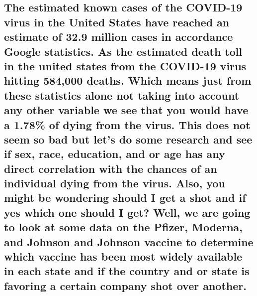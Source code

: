 \documentclass[
]{article}
\begin{document}
\hypertarget{the-estimated-known-cases-of-the-covid-19-virus-in-the-united-states-have-reached-an-estimate-of-32.9-million-cases-in-accordance-google-statistics.-as-the-estimated-death-toll-in-the-united-states-from-the-covid-19-virus-hitting-584000-deaths.-which-means-just-from-these-statistics-alone-not-taking-into-account-any-other-variable-we-see-that-you-would-have-a-1.78-of-dying-from-the-virus.-this-does-not-seem-so-bad-but-lets-do-some-research-and-see-if-sex-race-education-and-or-age-has-any-direct-correlation-with-the-chances-of-an-individual-dying-from-the-virus.-also-you-might-be-wondering-should-i-get-a-shot-and-if-yes-which-one-should-i-get-well-we-are-going-to-look-at-some-data-on-the-pfizer-moderna-and-johnson-and-johnson-vaccine-to-determine-which-vaccine-has-been-most-widely-available-in-each-state-and-if-the-country-and-or-state-is-favoring-a-certain-company-shot-over-another.}{%
\subsection{The estimated known cases of the COVID-19 virus in the
United States have reached an estimate of 32.9 million cases in
accordance Google statistics. As the estimated death toll in the united
states from the COVID-19 virus hitting 584,000 deaths. Which means just
from these statistics alone not taking into account any other variable
we see that you would have a 1.78\% of dying from the virus. This does
not seem so bad but let's do some research and see if sex, race,
education, and or age has any direct correlation with the chances of an
individual dying from the virus. Also, you might be wondering should I
get a shot and if yes which one should I get? Well, we are going to look
at some data on the Pfizer, Moderna, and Johnson and Johnson vaccine to
determine which vaccine has been most widely available in each state and
if the country and or state is favoring a certain company shot over
another.}\label{the-estimated-known-cases-of-the-covid-19-virus-in-the-united-states-have-reached-an-estimate-of-32.9-million-cases-in-accordance-google-statistics.-as-the-estimated-death-toll-in-the-united-states-from-the-covid-19-virus-hitting-584000-deaths.-which-means-just-from-these-statistics-alone-not-taking-into-account-any-other-variable-we-see-that-you-would-have-a-1.78-of-dying-from-the-virus.-this-does-not-seem-so-bad-but-lets-do-some-research-and-see-if-sex-race-education-and-or-age-has-any-direct-correlation-with-the-chances-of-an-individual-dying-from-the-virus.-also-you-might-be-wondering-should-i-get-a-shot-and-if-yes-which-one-should-i-get-well-we-are-going-to-look-at-some-data-on-the-pfizer-moderna-and-johnson-and-johnson-vaccine-to-determine-which-vaccine-has-been-most-widely-available-in-each-state-and-if-the-country-and-or-state-is-favoring-a-certain-company-shot-over-another.}}
\end{document}
